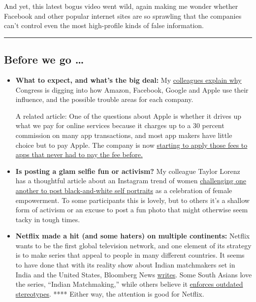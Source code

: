 And yet, this latest bogus video went wild, again making me wonder
whether Facebook and other popular internet sites are so sprawling that
the companies can't control even the most high-profile kinds of false
information.

\begin{center}\rule{0.5\linewidth}{\linethickness}\end{center}

\hypertarget{before-we-go-}{%
\subsection{Before we go \ldots{}}\label{before-we-go-}}

\begin{itemize}
\item
  \textbf{What to expect, and what's the big deal:} My
  \href{https://www.nytimes3xbfgragh.onion/2020/07/28/technology/amazon-apple-facebook-google-antitrust-hearing.html}{colleagues
  explain why} Congress is digging into how Amazon, Facebook, Google and
  Apple use their influence, and the possible trouble areas for each
  company.

  A related article: One of the questions about Apple is whether it
  drives up what we pay for online services because it charges up to a
  30 percent commission on many app transactions, and most app makers
  have little choice but to pay Apple. The company is now
  \href{https://www.nytimes3xbfgragh.onion/2020/07/28/technology/apple-app-store-airbnb-classpass.html}{starting
  to apply those fees to apps that never had to pay the fee before.}
\item
  \textbf{Is posting a glam selfie fun or activism?} My colleague Taylor
  Lorenz has a thoughtful article about an Instagram trend of women
  \href{https://www.nytimes3xbfgragh.onion/2020/07/27/style/challenge-accepted-instagram.html}{challenging
  one another to post black-and-white self portraits} as a celebration
  of female empowerment. To some participants this is lovely, but to
  others it's a shallow form of activism or an excuse to post a fun
  photo that might otherwise seem tacky in tough times.
\item
  \textbf{Netflix made a hit (and some haters) on multiple continents:}
  Netflix wants to be the first global television network, and one
  element of its strategy is to make series that appeal to people in
  many different countries. It seems to have done that with its reality
  show about Indian matchmakers set in India and the United States,
  Bloomberg News
  \href{https://www.bloomberg.com/news/articles/2020-07-24/netflix-s-reality-series-on-roving-indian-matchmaker-goes-viral}{writes}.
  Some South Asians love the series, ``Indian Matchmaking,'' while
  others believe it
  \href{https://www.thecut.com/2020/07/indian-matchmaking-review.html}{enforces
  outdated stereotypes}. **** Either way, the attention is good for
  Netflix.
\end{itemize}

